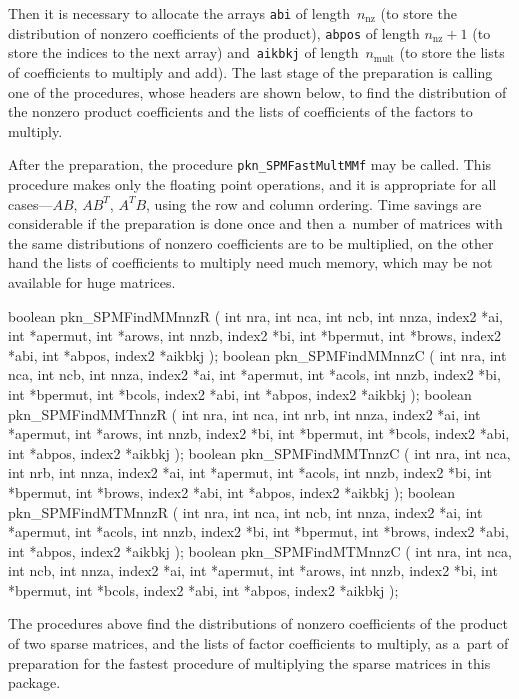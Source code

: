 Then it is necessary to allocate the arrays \texttt{abi} of
length~$n_{\mathrm{nz}}$ (to store the distribution of nonzero coefficients
of the product), \texttt{abpos} of length $n_{\mathrm{nz}}+1$ (to store the
indices to the next array) and~\texttt{aikbkj} of length~$n_{\mathrm{mult}}$
(to store the lists of coefficients to multiply and add). The last stage of
the preparation is calling one of the procedures, whose headers are shown
below, to find the distribution of the nonzero product coefficients and the
lists of coefficients of the factors to multiply.

After the preparation, the procedure \texttt{pkn\_SPMFastMultMMf} may be
called. This procedure makes only the floating point operations, and it is
appropriate for all cases---$AB$, $AB^T$, $A^TB$, using the row and column
ordering. Time savings are considerable if the preparation is done once and
then a~number of matrices with the same distributions of nonzero
coefficients are to be multiplied, on the other hand the lists of
coefficients to multiply need much memory, which may be not available for
huge matrices.

\begin{listingC}
boolean pkn_SPMFindMMnnzR ( int nra, int nca, int ncb,  
                      int nnza, index2 *ai, int *apermut, int *arows,
                      int nnzb, index2 *bi, int *bpermut, int *brows,
                      index2 *abi, int *abpos, index2 *aikbkj );
boolean pkn_SPMFindMMnnzC ( int nra, int nca, int ncb,  
                      int nnza, index2 *ai, int *apermut, int *acols,
                      int nnzb, index2 *bi, int *bpermut, int *bcols,
                      index2 *abi, int *abpos, index2 *aikbkj );
boolean pkn_SPMFindMMTnnzR ( int nra, int nca, int nrb,  
                       int nnza, index2 *ai, int *apermut, int *arows,
                       int nnzb, index2 *bi, int *bpermut, int *bcols,
                       index2 *abi, int *abpos, index2 *aikbkj );
boolean pkn_SPMFindMMTnnzC ( int nra, int nca, int nrb,  
                       int nnza, index2 *ai, int *apermut, int *acols,
                       int nnzb, index2 *bi, int *bpermut, int *brows,
                       index2 *abi, int *abpos, index2 *aikbkj );
boolean pkn_SPMFindMTMnnzR ( int nra, int nca, int ncb,  
                       int nnza, index2 *ai, int *apermut, int *acols,
                       int nnzb, index2 *bi, int *bpermut, int *brows,
                       index2 *abi, int *abpos, index2 *aikbkj );
boolean pkn_SPMFindMTMnnzC ( int nra, int nca, int ncb,  
                       int nnza, index2 *ai, int *apermut, int *arows,
                       int nnzb, index2 *bi, int *bpermut, int *bcols,
                       index2 *abi, int *abpos, index2 *aikbkj );
\end{listingC}
The procedures above find the distributions of nonzero coefficients of the
product of two sparse matrices, and the lists of factor coefficients to
multiply, as a~part of preparation for the fastest procedure of multiplying
the sparse matrices in this package.

